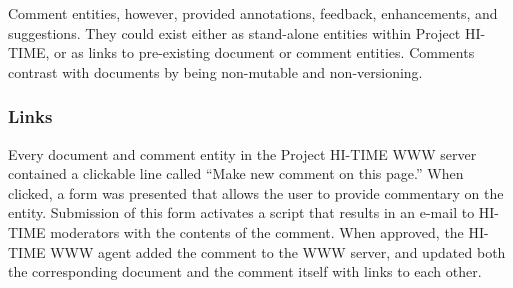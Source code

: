 Comment entities, however, provided annotations, feedback,
enhancements, and suggestions. They could exist either as stand-alone entities
within Project HI-TIME, or as links to pre-existing document or comment
entities. Comments contrast with documents by being non-mutable and
non-versioning. 

\subsubsection{Links}

Every document and comment entity in the Project HI-TIME WWW server contained
a clickable line called ``Make new comment on this page.''  When clicked,
a form was presented that allows the user to provide commentary on the
entity.  Submission of this form activates a script that results in an
e-mail to HI-TIME moderators with the contents of the comment.  When 
approved, the HI-TIME WWW agent added the comment to the WWW server, 
and updated both the corresponding document and the comment itself
with links to each other.  



